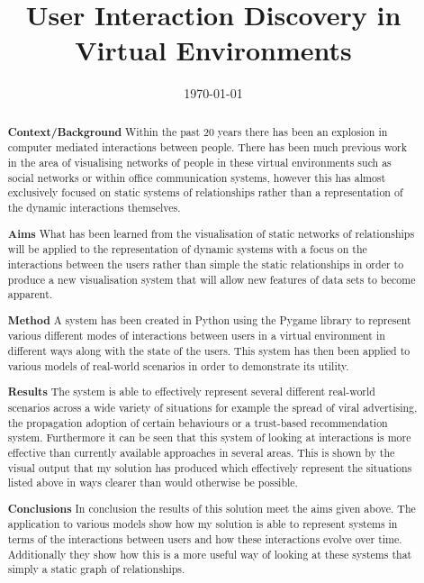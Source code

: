 \documentclass[12pt,a4paper]{article}
\title{User Interaction Discovery in Virtual Environments}
\date{\today}
\begin{document}
\maketitle

\begin{abstract}

{\bf Context/Background}
Within the past 20 years there has been an explosion in computer mediated interactions between people. There has been much previous work in the area of visualising networks of people in these virtual environments such as social networks or within office communication systems, however this has almost exclusively focused on static systems of relationships rather than a representation of the dynamic interactions themselves.

{\bf Aims}
What has been learned from the visualisation of static networks of relationships will be applied to the representation of dynamic systems with a focus on the interactions between the users rather than simple the static relationships in order to produce a new visualisation system that will allow new features of data sets to become apparent.

{\bf Method}
A system has been created in Python using the Pygame library to represent various different modes of interactions between users in a virtual environment in different ways along with the state of the users. This system has then been applied to various models of real-world scenarios in order to demonstrate its utility.

{\bf Results}
The system is able to effectively represent several different real-world scenarios across a wide variety of situations for example the spread of viral advertising, the propagation adoption of certain behaviours or a trust-based recommendation system. Furthermore it can be seen that this system of looking at interactions is more effective than currently available approaches in several areas. This is shown by the visual output that my solution has produced which effectively represent the situations listed above in ways clearer than would otherwise be possible.

{\bf Conclusions}
In conclusion the results of this solution meet the aims given above. The application to various models show how my solution is able to represent systems in terms of the interactions between users and how these interactions evolve over time. Additionally they show how this is a more useful way of looking at these systems that simply a static graph of relationships.

\end{abstract}
\end{document}
